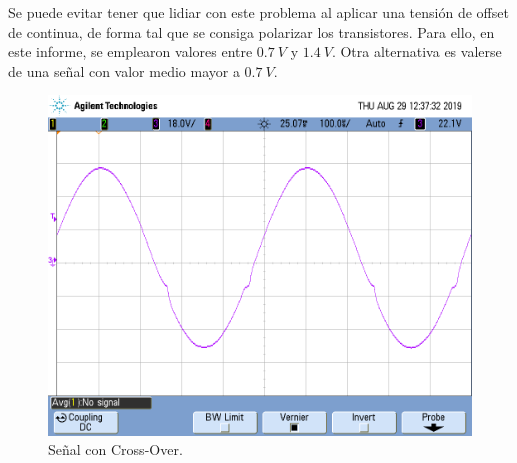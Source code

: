 Se puede evitar tener que lidiar con este problema al aplicar una tensión de offset de continua, de forma tal que se consiga polarizar los transistores. Para ello, en este informe, se emplearon valores entre $0.7 \ V$ y $1.4 \ V$. Otra alternativa es valerse de una señal con valor medio mayor a $0.7 \ V$. 
\begin{figure}[H]	
	\centering
	\includegraphics[width=\textwidth]{Ejercicio1/Imagenes/CrossOver.png}
	\caption{Señal con Cross-Over.}
	\label{fig:co}
\end{figure} 

